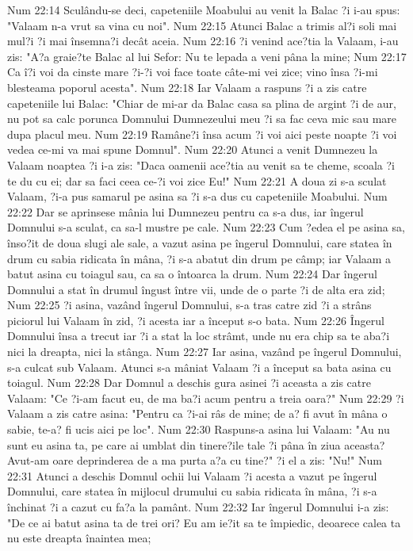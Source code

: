 Num 22:14  Sculându-se deci, capeteniile Moabului au venit la Balac ?i i-au spus: "Valaam n-a vrut sa vina cu noi".
Num 22:15  Atunci Balac a trimis al?i soli mai mul?i ?i mai însemna?i decât aceia.
Num 22:16  ?i venind ace?tia la Valaam, i-au zis: "A?a graie?te Balac al lui Sefor: Nu te lepada a veni pâna la mine;
Num 22:17  Ca î?i voi da cinste mare ?i-?i voi face toate câte-mi vei zice; vino însa ?i-mi blesteama poporul acesta".
Num 22:18  Iar Valaam a raspuns ?i a zis catre capeteniile lui Balac: "Chiar de mi-ar da Balac casa sa plina de argint ?i de aur, nu pot sa calc porunca Domnului Dumnezeului meu ?i sa fac ceva mic sau mare dupa placul meu.
Num 22:19  Ramâne?i însa acum ?i voi aici peste noapte ?i voi vedea ce-mi va mai spune Domnul".
Num 22:20  Atunci a venit Dumnezeu la Valaam noaptea ?i i-a zis: "Daca oamenii ace?tia au venit sa te cheme, scoala ?i te du cu ei; dar sa faci ceea ce-?i voi zice Eu!"
Num 22:21  A doua zi s-a sculat Valaam, ?i-a pus samarul pe asina sa ?i s-a dus cu capeteniile Moabului.
Num 22:22  Dar se aprinsese mânia lui Dumnezeu pentru ca s-a dus, iar îngerul Domnului s-a sculat, ca sa-l mustre pe cale.
Num 22:23  Cum ?edea el pe asina sa, înso?it de doua slugi ale sale, a vazut asina pe îngerul Domnului, care statea în drum cu sabia ridicata în mâna, ?i s-a abatut din drum pe câmp; iar Valaam a batut asina cu toiagul sau, ca sa o întoarca la drum.
Num 22:24  Dar îngerul Domnului a stat în drumul îngust între vii, unde de o parte ?i de alta era zid;
Num 22:25  ?i asina, vazând îngerul Domnului, s-a tras catre zid ?i a strâns piciorul lui Valaam în zid, ?i acesta iar a început s-o bata.
Num 22:26  Îngerul Domnului însa a trecut iar ?i a stat la loc strâmt, unde nu era chip sa te aba?i nici la dreapta, nici la stânga.
Num 22:27  Iar asina, vazând pe îngerul Domnului, s-a culcat sub Valaam. Atunci s-a mâniat Valaam ?i a început sa bata asina cu toiagul.
Num 22:28  Dar Domnul a deschis gura asinei ?i aceasta a zis catre Valaam: "Ce ?i-am facut eu, de ma ba?i acum pentru a treia oara?"
Num 22:29  ?i Valaam a zis catre asina: "Pentru ca ?i-ai râs de mine; de a? fi avut în mâna o sabie, te-a? fi ucis aici pe loc".
Num 22:30  Raspuns-a asina lui Valaam: "Au nu sunt eu asina ta, pe care ai umblat din tinere?ile tale ?i pâna în ziua aceasta? Avut-am oare deprinderea de a ma purta a?a cu tine?" ?i el a zis: "Nu!"
Num 22:31  Atunci a deschis Domnul ochii lui Valaam ?i acesta a vazut pe îngerul Domnului, care statea în mijlocul drumului cu sabia ridicata în mâna, ?i s-a închinat ?i a cazut cu fa?a la pamânt.
Num 22:32  Iar îngerul Domnului i-a zis: "De ce ai batut asina ta de trei ori? Eu am ie?it sa te împiedic, deoarece calea ta nu este dreapta înaintea mea;

